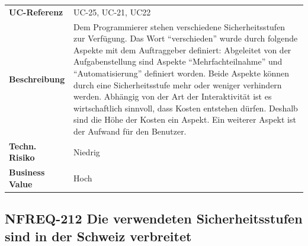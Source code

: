 \begin{longtable}[c]{@{}ll@{}}
\toprule
\begin{minipage}[t]{0.20\columnwidth}\raggedright\strut
\textbf{UC-Referenz}
\strut\end{minipage} &
\begin{minipage}[t]{0.74\columnwidth}\raggedright\strut
UC-25, UC-21, UC22
\strut\end{minipage}\tabularnewline
\begin{minipage}[t]{0.20\columnwidth}\raggedright\strut
\textbf{Beschreibung}
\strut\end{minipage} &
\begin{minipage}[t]{0.74\columnwidth}\raggedright\strut
Dem Programmierer stehen verschiedene Sicherheitsstufen zur Verfügung.
Das Wort ``verschieden'' wurde durch folgende Aspekte mit dem
Auftraggeber definiert: Abgeleitet von der Aufgabenstellung sind Aspekte
``Mehrfachteilnahme'' und ``Automatisierung'' definiert worden. Beide
Aspekte können durch eine Sicherheitsstufe mehr oder weniger verhindern
werden. Abhängig von der Art der Interaktivität ist es wirtschaftlich
sinnvoll, dass Kosten entstehen dürfen. Deshalb sind die Höhe der Kosten
ein Aspekt. Ein weiterer Aspekt ist der Aufwand für den Benutzer.
\strut\end{minipage}\tabularnewline
\begin{minipage}[t]{0.20\columnwidth}\raggedright\strut
\textbf{Techn. Risiko}
\strut\end{minipage} &
\begin{minipage}[t]{0.74\columnwidth}\raggedright\strut
Niedrig
\strut\end{minipage}\tabularnewline
\begin{minipage}[t]{0.20\columnwidth}\raggedright\strut
\textbf{Business Value}
\strut\end{minipage} &
\begin{minipage}[t]{0.74\columnwidth}\raggedright\strut
Hoch
\strut\end{minipage}\tabularnewline
\bottomrule
\end{longtable}

\subsection{NFREQ-212 Die verwendeten Sicherheitsstufen sind in der
Schweiz
verbreitet}\label{nfreq-212-die-verwendeten-sicherheitsstufen-sind-in-der-schweiz-verbreitet}

